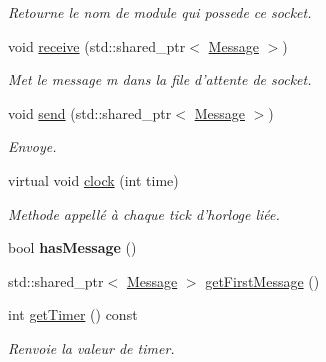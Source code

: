 \begin{DoxyCompactItemize}
\begin{DoxyCompactList}\small\item\em Retourne le nom de module qui possede ce socket. \end{DoxyCompactList}\item 
\hypertarget{classSocket_a9adf799b90c455f3a1f4151adb031fd0}{void \hyperlink{classSocket_a9adf799b90c455f3a1f4151adb031fd0}{receive} (std\-::shared\-\_\-ptr$<$ \hyperlink{classMessage}{Message} $>$)}\label{classSocket_a9adf799b90c455f3a1f4151adb031fd0}

\begin{DoxyCompactList}\small\item\em Met le message m dans la file d'attente de socket. \end{DoxyCompactList}\item 
void \hyperlink{classSocket_a06b687baf9b01f3e399a5ee040ca04e4}{send} (std\-::shared\-\_\-ptr$<$ \hyperlink{classMessage}{Message} $>$)
\begin{DoxyCompactList}\small\item\em Envoye. \end{DoxyCompactList}\item 
\hypertarget{classSocket_a6bd5bddfabd838a3388b445c21d3c41e}{virtual void \hyperlink{classSocket_a6bd5bddfabd838a3388b445c21d3c41e}{clock} (int time)}\label{classSocket_a6bd5bddfabd838a3388b445c21d3c41e}

\begin{DoxyCompactList}\small\item\em Methode appellé à chaque tick d'horloge liée. \end{DoxyCompactList}\item 
\hypertarget{classSocket_afe7c9b2ef7fb3653b14f5f462293549a}{bool {\bfseries has\-Message} ()}\label{classSocket_afe7c9b2ef7fb3653b14f5f462293549a}

\item 
std\-::shared\-\_\-ptr$<$ \hyperlink{classMessage}{Message} $>$ \hyperlink{classSocket_a71e162a0ca00b1a46fe23eaccb09f76d}{get\-First\-Message} ()
\item 
\hypertarget{classSocket_aa890633022a29b56ed3844684d32e0fc}{int \hyperlink{classSocket_aa890633022a29b56ed3844684d32e0fc}{get\-Timer} () const }\label{classSocket_aa890633022a29b56ed3844684d32e0fc}

\begin{DoxyCompactList}\small\item\em Renvoie la valeur de timer. \end{DoxyCompactList}\end{DoxyCompactItemize}


